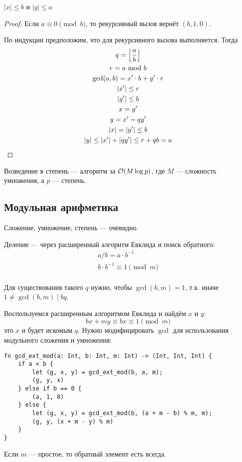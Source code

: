 \begin{theorem}
    $|x| \le b$ и $|y| \le a$
\end{theorem}
\begin{proof}
    Если $a \equiv 0 \pmod b$,
    то рекурсивный вызов вернёт $(b, 1, 0)$.

    По индукции предположим, что для рекурсивного вызова выполняется.
    Тогда
    \begin{gather*}
        q = \left \lfloor \frac{a}{b} \right \rfloor \\
        r = a ~\text{mod}~ b \\
        \gcd(a, b) = x' \cdot b + y' \cdot r \\
        |x'| \le r \\
        |y'| \le b \\
        x = y' \\
        y = x' - qy' \\
        |x| = |y'| \le b \\
        |y| \le |x'| + |qy'| \le r + qb = a
    \end{gather*}
\end{proof}

Возведение в степень --- алгоритм за $\mathcal{O}(M \log p)$,
где $M$ --- сложность умножения, а $p$ --- степень.

\subsection{Модульная арифметика}
Сложение, умножение, степень --- очевидно.

Деление --- через расширенный алгоритм Евклида
и поиск обратного:
\begin{gather*}
    a / b = a \cdot b^{-1} \\
    b \cdot b^{-1} \equiv 1 \pmod m \\
\end{gather*}

Для существования такого $q$ нужно,
чтобы $\gcd(b, m) = 1$, т.к. иначе
$1 \ne \gcd(b, m) \mid bq$.

Воспользуемся расширенным алгоритмом Евклида и найдём $x$ и $y$:
\[ bx + my \equiv bx \equiv 1 \pmod m \]
это $x$ и будет искомым $q$.
Нужно модифицировать $\gcd$ для использования модульного
сложения и умножения:
\begin{verbatim}
fn gcd_ext_mod(a: Int, b: Int, m: Int) -> (Int, Int, Int) {
    if a < b {
        let (g, x, y) = gcd_ext_mod(b, a, m);
        (g, y, x)
    } else if b == 0 {
        (a, 1, 0)
    } else {
        let (g, x, y) = gcd_ext_mod(b, (a + m - b) % m, m);
        (g, y, (x + m - y) % m)
    }
}
\end{verbatim}

Если $m$ --- простое, то обратный элемент есть всегда.

